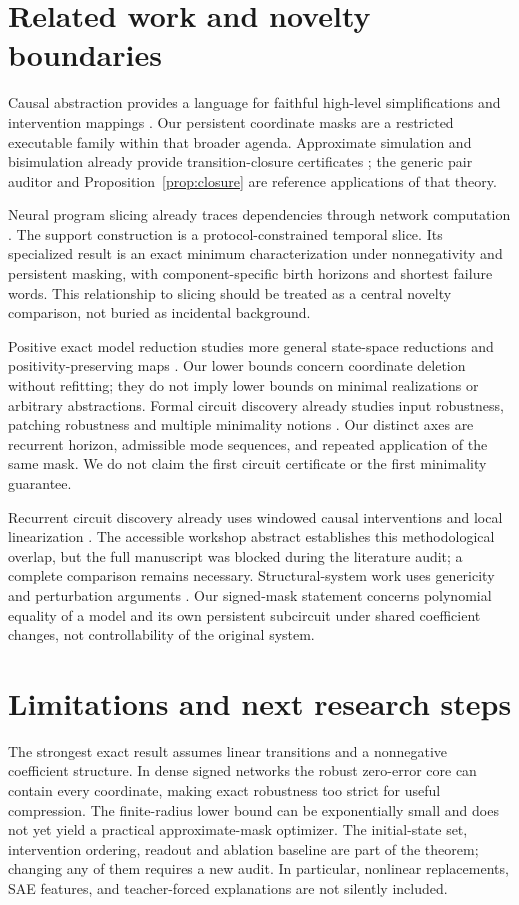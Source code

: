 \section{Related work and novelty boundaries}
Causal abstraction provides a language for faithful high-level simplifications and intervention mappings \citep{geiger2025}. Our persistent coordinate masks are a restricted executable family within that broader agenda. Approximate simulation and bisimulation already provide transition-closure certificates \citep{girard2011}; the generic pair auditor and Proposition~\ref{prop:closure} are reference applications of that theory.

Neural program slicing already traces dependencies through network computation \citep{zhang2020}. The support construction is a protocol-constrained temporal slice. Its specialized result is an exact minimum characterization under nonnegativity and persistent masking, with component-specific birth horizons and shortest failure words. This relationship to slicing should be treated as a central novelty comparison, not buried as incidental background.

Positive exact model reduction studies more general state-space reductions and positivity-preserving maps \citep{cortese2025}. Our lower bounds concern coordinate deletion without refitting; they do not imply lower bounds on minimal realizations or arbitrary abstractions. Formal circuit discovery already studies input robustness, patching robustness and multiple minimality notions \citep{hadad2026}. Our distinct axes are recurrent horizon, admissible mode sequences, and repeated application of the same mask. We do not claim the first circuit certificate or the first minimality guarantee.

Recurrent circuit discovery already uses windowed causal interventions and local linearization \citep{balwani}. The accessible workshop abstract establishes this methodological overlap, but the full manuscript was blocked during the literature audit; a complete comparison remains necessary. Structural-system work uses genericity and perturbation arguments \citep{zhang2021}. Our signed-mask statement concerns polynomial equality of a model and its own persistent subcircuit under shared coefficient changes, not controllability of the original system.

\section{Limitations and next research steps}
The strongest exact result assumes linear transitions and a nonnegative coefficient structure. In dense signed networks the robust zero-error core can contain every coordinate, making exact robustness too strict for useful compression. The finite-radius lower bound can be exponentially small and does not yet yield a practical approximate-mask optimizer. The initial-state set, intervention ordering, readout and ablation baseline are part of the theorem; changing any of them requires a new audit. In particular, nonlinear replacements, SAE features, and teacher-forced explanations are not silently included.

